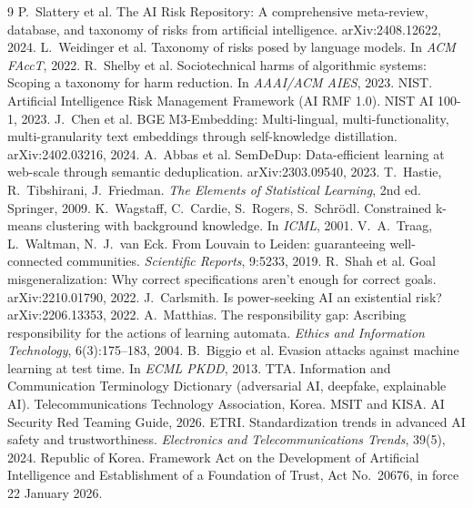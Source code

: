 \documentclass[11pt,a4paper]{article}
\begin{document}
\begin{thebibliography}{9}
\small
{} P.~Slattery et al. The AI Risk Repository: A comprehensive meta-review, database, and taxonomy of risks from artificial intelligence. arXiv:2408.12622, 2024.
 L.~Weidinger et al. Taxonomy of risks posed by language models. In \emph{ACM FAccT}, 2022.
 R.~Shelby et al. Sociotechnical harms of algorithmic systems: Scoping a taxonomy for harm reduction. In \emph{AAAI/ACM AIES}, 2023.
 NIST. Artificial Intelligence Risk Management Framework (AI RMF 1.0). NIST AI 100-1, 2023.
 J.~Chen et al. BGE M3-Embedding: Multi-lingual, multi-functionality, multi-granularity text embeddings through self-knowledge distillation. arXiv:2402.03216, 2024.
 A.~Abbas et al. SemDeDup: Data-efficient learning at web-scale through semantic deduplication. arXiv:2303.09540, 2023.
 T.~Hastie, R.~Tibshirani, J.~Friedman. \emph{The Elements of Statistical Learning}, 2nd ed. Springer, 2009.
 K.~Wagstaff, C.~Cardie, S.~Rogers, S.~Schr\"odl. Constrained k-means clustering with background knowledge. In \emph{ICML}, 2001.
 V.~A.~Traag, L.~Waltman, N.~J.~van Eck. From Louvain to Leiden: guaranteeing well-connected communities. \emph{Scientific Reports}, 9:5233, 2019.
 R.~Shah et al. Goal misgeneralization: Why correct specifications aren't enough for correct goals. arXiv:2210.01790, 2022.
 J.~Carlsmith. Is power-seeking AI an existential risk? arXiv:2206.13353, 2022.
 A.~Matthias. The responsibility gap: Ascribing responsibility for the actions of learning automata. \emph{Ethics and Information Technology}, 6(3):175--183, 2004.
 B.~Biggio et al. Evasion attacks against machine learning at test time. In \emph{ECML PKDD}, 2013.
 TTA. Information and Communication Terminology Dictionary (adversarial AI, deepfake, explainable AI). Telecommunications Technology Association, Korea.
 MSIT and KISA. AI Security Red Teaming Guide, 2026.
 ETRI. Standardization trends in advanced AI safety and trustworthiness. \emph{Electronics and Telecommunications Trends}, 39(5), 2024.
 Republic of Korea. Framework Act on the Development of Artificial Intelligence and Establishment of a Foundation of Trust, Act No.~20676, in force 22 January 2026.
\end{thebibliography}
\end{document}

